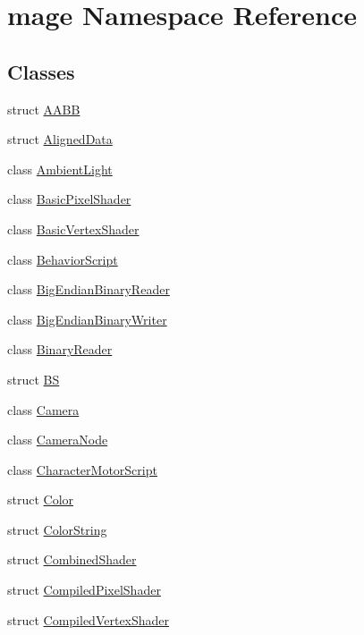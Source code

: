 \hypertarget{namespacemage}{}\section{mage Namespace Reference}
\label{namespacemage}
\subsection*{Classes}
\begin{DoxyCompactItemize}
\item 
struct \hyperlink{structmage_1_1_a_a_b_b}{A\+A\+BB}
\item 
struct \hyperlink{structmage_1_1_aligned_data}{Aligned\+Data}
\item 
class \hyperlink{classmage_1_1_ambient_light}{Ambient\+Light}
\item 
class \hyperlink{classmage_1_1_basic_pixel_shader}{Basic\+Pixel\+Shader}
\item 
class \hyperlink{classmage_1_1_basic_vertex_shader}{Basic\+Vertex\+Shader}
\item 
class \hyperlink{classmage_1_1_behavior_script}{Behavior\+Script}
\item 
class \hyperlink{classmage_1_1_big_endian_binary_reader}{Big\+Endian\+Binary\+Reader}
\item 
class \hyperlink{classmage_1_1_big_endian_binary_writer}{Big\+Endian\+Binary\+Writer}
\item 
class \hyperlink{classmage_1_1_binary_reader}{Binary\+Reader}
\item 
struct \hyperlink{structmage_1_1_b_s}{BS}
\item 
class \hyperlink{classmage_1_1_camera}{Camera}
\item 
class \hyperlink{classmage_1_1_camera_node}{Camera\+Node}
\item 
class \hyperlink{classmage_1_1_character_motor_script}{Character\+Motor\+Script}
\item 
struct \hyperlink{structmage_1_1_color}{Color}
\item 
struct \hyperlink{structmage_1_1_color_string}{Color\+String}
\item 
struct \hyperlink{structmage_1_1_combined_shader}{Combined\+Shader}
\item 
struct \hyperlink{structmage_1_1_compiled_pixel_shader}{Compiled\+Pixel\+Shader}
\item 
struct \hyperlink{structmage_1_1_compiled_vertex_shader}{Compiled\+Vertex\+Shader}
\item 

\end{DoxyCompactItemize}
